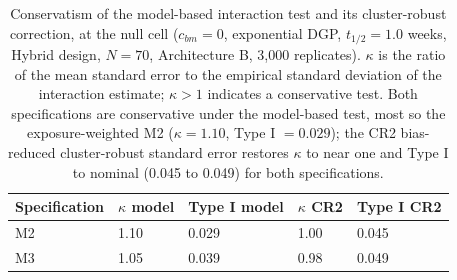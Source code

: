 \documentclass[
  11pt,
]{article}
\begin{document}
\begin{table}

\caption{\label{tab:tab-type1-cr2}Conservatism of the model-based interaction test and its
    cluster-robust correction, at the null cell ($c_{bm} = 0$,
    exponential DGP, $t_{1/2} = 1.0$ weeks, Hybrid design, $N = 70$,
    Architecture B, 3{,}000 replicates). $\kappa$ is the ratio of the
    mean standard error to the empirical standard deviation of the
    interaction estimate; $\kappa > 1$ indicates a conservative
    test. Both specifications are conservative under the model-based
    test, most so the exposure-weighted M2 ($\kappa = 1.10$, Type I
    $= 0.029$); the CR2 bias-reduced cluster-robust standard error
    restores $\kappa$ to near one and Type I to nominal (0.045 to
    0.049) for both specifications.}
\centering
\begin{tabular}[t]{lllll}
\toprule
Specification & $\kappa$ model & Type I model & $\kappa$ CR2 & Type I CR2\\
\midrule
M2 & 1.10 & 0.029 & 1.00 & 0.045\\
M3 & 1.05 & 0.039 & 0.98 & 0.049\\
\bottomrule
\end{tabular}
\end{table}

\begin{table}
\centering
\caption{\label{tab:tab-s6}Cluster-robust recalibration of M2 (Power columns) and
    of the M2$-$M3 ranking (last two columns), at the reference cell
    and four stress cells (500 replicates, $c_{bm} = 0.45$,
    Architecture B). $\kappa$ is the ratio of the mean standard
    error to the empirical standard deviation of the interaction
    estimate for M2; a value above one is a conservative test. The
    M2$-$M3 columns are computed directly from the per-specification
    power at this cell under each inference, so they are a genuine
    check of this manuscript's own comparison rather than the
    M2-vs-M1 contrast reported for the full-scope grid. CR2 df is
    the mean Satterthwaite degrees of freedom for the cluster-robust
    test on M2. Computed with \texttt{clubSandwich}.}
\centering
{}
\end{table}
\end{document}
